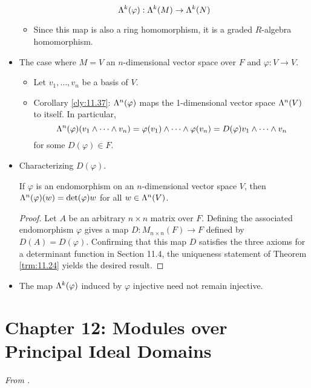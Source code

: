 \documentclass[../notes.tex]{subfiles}
\begin{document}
\begin{itemize}
    \begin{equation*}
        \lam[k]{\varphi}:\lam[k]{M}\to\lam[k]{N}
    \end{equation*}
    \begin{itemize}
        \item Since this map is also a ring homomorphism, it is a graded $R$-algebra homomorphism.
    \end{itemize}
    \item The case where $M=V$ an $n$-dimensional vector space over $F$ and $\varphi:V\to V$.
    \begin{itemize}
        \item Let $v_1,\dots,v_n$ be a basis of $V$.
        \item Corollary \ref{cly:11.37}: $\lam[n]{\varphi}$ maps the 1-dimensional vector space $\lam[n]{V}$ to itself. In particular,
        \begin{equation*}
            \lam[n]{\varphi}(v_1\wedge\cdots\wedge v_n) = \varphi(v_1)\wedge\cdots\wedge\varphi(v_n)
            = D(\varphi)v_1\wedge\cdots\wedge v_n
        \end{equation*}
        for some $D(\varphi)\in F$.
    \end{itemize}
    \item Characterizing $D(\varphi)$.
    \begin{proposition}\label{prp:11.38}
        If $\varphi$ is an endomorphism on an $n$-dimensional vector space $V$, then $\lam[n]{\varphi}(w)=\det(\varphi)w$ for all $w\in\lam[n]{V}$.
        \begin{proof}
            Let $A$ be an arbitrary $n\times n$ matrix over $F$. Defining the associated endomorphism $\varphi$ gives a map $D:M_{n\times n}(F)\to F$ defined by $D(A)=D(\varphi)$. Confirming that this map $D$ satisfies the three axioms for a determinant function in Section 11.4, the uniqueness statement of Theorem \ref{trm:11.24} yields the desired result. 
        \end{proof}
    \end{proposition}
    \item The map $\lam[k]{\varphi}$ induced by $\varphi$ injective need not remain injective.
\end{itemize}



\section{Chapter 12: Modules over Principal Ideal Domains}
\emph{From \textcite{bib:DummitFoote}.}
\setcounter{bookch}{12}
\setcounter{proposition}{11}
\end{document}
